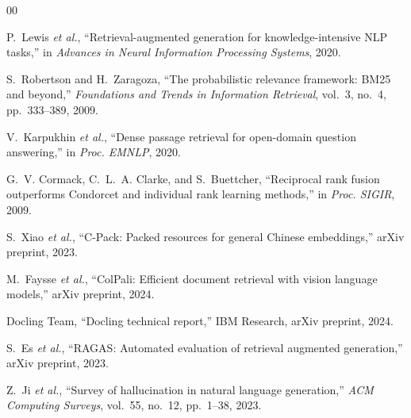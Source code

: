 \documentclass[conference]{IEEEtran}
\begin{document}
\begin{thebibliography}{00}

P.~Lewis \emph{et al.}, ``Retrieval-augmented generation for knowledge-intensive
NLP tasks,'' in \emph{Advances in Neural Information Processing Systems}, 2020.

S.~Robertson and H.~Zaragoza, ``The probabilistic relevance framework: BM25 and
beyond,'' \emph{Foundations and Trends in Information Retrieval}, vol.~3,
no.~4, pp.~333--389, 2009.

V.~Karpukhin \emph{et al.}, ``Dense passage retrieval for open-domain question
answering,'' in \emph{Proc. EMNLP}, 2020.

G.~V. Cormack, C.~L.~A. Clarke, and S.~Buettcher, ``Reciprocal rank fusion
outperforms Condorcet and individual rank learning methods,'' in
\emph{Proc. SIGIR}, 2009.

S.~Xiao \emph{et al.}, ``C-Pack: Packed resources for general Chinese
embeddings,'' arXiv preprint, 2023.

M.~Faysse \emph{et al.}, ``ColPali: Efficient document retrieval with vision
language models,'' arXiv preprint, 2024.

Docling Team, ``Docling technical report,'' IBM Research, arXiv preprint, 2024.

S.~Es \emph{et al.}, ``RAGAS: Automated evaluation of retrieval augmented
generation,'' arXiv preprint, 2023.

Z.~Ji \emph{et al.}, ``Survey of hallucination in natural language
generation,'' \emph{ACM Computing Surveys}, vol.~55, no.~12, pp.~1--38, 2023.

\end{thebibliography}
\end{document}
